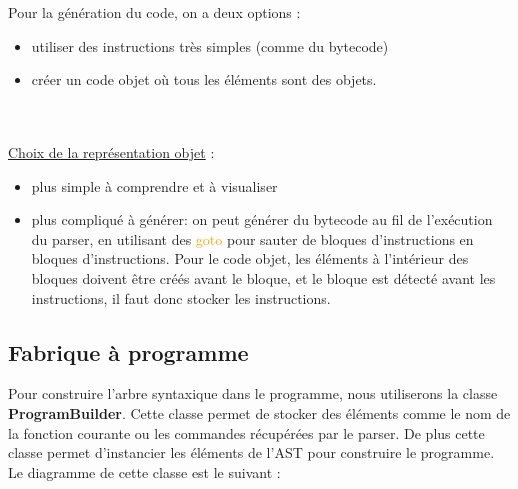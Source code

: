 \documentclass[a4paper]{article}%
\begin{document}
Pour la génération du code, on a deux options :
\begin{itemize}
  \item utiliser des instructions très simples (comme du \gls{bytecode})
\item créer un code objet où tous les éléments sont des objets.
\end{itemize}\leavevmode\\~\\

\underline{Choix de la représentation objet} :
\begin{itemize}
\item plus simple à comprendre et à visualiser
\item plus compliqué à générer: on peut générer du bytecode au fil de
  l'exécution du \gls{parser}, en utilisant des \textcolor{orange}{goto} pour
    sauter de bloques d'instructions en bloques d'instructions. Pour le code objet,
    les éléments à l'intérieur des bloques doivent être créés avant le bloque, et
    le bloque est détecté avant les instructions, il faut donc stocker les
    instructions.
\end{itemize}


\clearpage{}

\subsection{Fabrique à programme}\label{sec:fabprog}

Pour construire l'arbre syntaxique dans le programme, nous utiliserons
la classe \textbf{ProgramBuilder}. Cette classe permet de stocker des éléments
comme le nom de la fonction courante ou les commandes récupérées par le
\gls{parser}.
De plus cette classe permet d'instancier les éléments de l'AST pour construire
le programme. Le diagramme de cette classe est le suivant :
\end{document}
